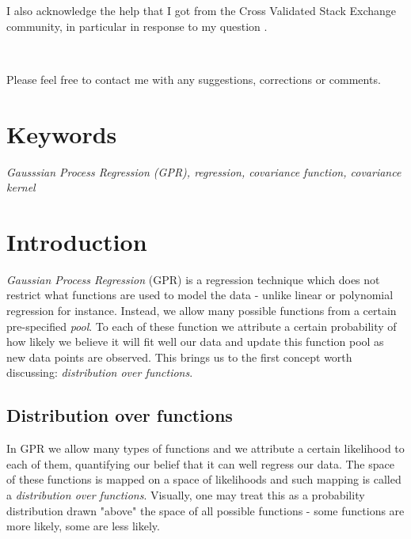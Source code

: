 \documentclass[10pt,twocolumn]{article}
\begin{document}
I also acknowledge the help that I got from the Cross Validated Stack Exchange community, in particular in response to my question \cite{SE}.

\,\,

Please feel free to contact me with any suggestions, corrections or comments.

\section*{Keywords}

\textit{Gausssian Process Regression (GPR), regression, covariance function, covariance kernel}

\tableofcontents

\section{Introduction}

\textit{Gaussian Process Regression} (GPR) is a regression technique which does not restrict what functions are used to model the data - unlike linear or polynomial regression for instance. Instead, we allow many possible functions from a certain pre-specified \textit{pool}. To each of these function we attribute a certain probability of how likely we believe it will fit well our data and update this function pool as new data points are observed. This brings us to the first concept worth discussing: \textit{distribution over functions}.





\subsection{Distribution over functions} \label{sec:dist_over_fun}

In GPR we allow many types of functions and we attribute a certain likelihood to each of them, quantifying our belief that it can well regress our data. The space of these functions is mapped on a space of likelihoods and such mapping is called a \textit{distribution over functions}. Visually, one may treat this as a probability distribution drawn "above" the space of all possible functions - some functions are more likely, some are less likely.
\end{document}
